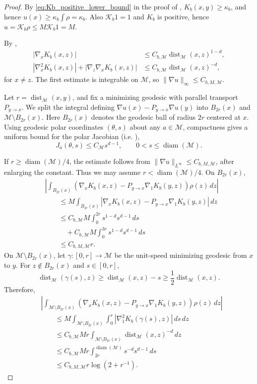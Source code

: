 \documentclass[11pt]{article}
\theoremstyle{definition}
\def\Kb{\mathcal K_b}
\def\M{\mathcal M}
\begin{document}
\begin{proof}
By \eqref{eq:Kb_positive_lower_bound} in the proof of
, \(K_b(x,y)\ge\kappa_b\), and hence
\(u(x)\ge\kappa_b\int\rho=\kappa_b\).
Also \(\Kb1=1\) and \(K_b\) is positive, hence \(u=\Kb\rho\le M\Kb1=M\).

By ,
\[
\begin{aligned}
|\nabla_xK_b(x,z)|
&\le C_{b,\M}\operatorname{dist}_{\M}(x,z)^{1-d},\\
|\nabla_x^2K_b(x,z)|+|\nabla_z\nabla_xK_b(x,z)|
&\le C_{b,\M}\operatorname{dist}_{\M}(x,z)^{-d},
\end{aligned}
\]
for \(x\neq z\). The first estimate is integrable on  \(\M\), so
\(\|\nabla u\|_\infty\le C_{b,M,\M}\).

Let \(r=\operatorname{dist}_{ \M}(x,y)\), and fix a minimizing geodesic with parallel
transport \(P_{y\to x}\). 
We split the integral defining \(\nabla u(x)-P_{y\to x}\nabla u(y)\) into
\(B_{2r}(x)\) and \( \M\setminus B_{2r}(x)\). 
Here $B_{2r}(x)$ denotes the geodesic ball of radius $2r$ centered at $x$. Using geodesic polar coordinates $(\theta,s)$ about any \(a\in\M\),
 compactness gives a uniform bound for the polar
Jacobian (i.e. \cite[Eq.~(9)]{girouard2021large}),
\[
J_a(\theta,s)\le C_{\M}s^{d-1},
\qquad
0<s\le\operatorname{diam}(\M).
\]

If \(r\ge\operatorname{diam}(\M)/4\), the estimate follows from
\(\|\nabla u\|_{L^\infty}\le C_{b,M,\M}\), after enlarging the constant. Thus we
may assume \(r<\operatorname{diam}(\M)/4\).
On $B_{2r}(x)$,
\[
\begin{aligned}
&\left|
\int_{B_{2r}(x)}
\left(\nabla_xK_b(x,z)-P_{y\to x}\nabla_1K_b(y,z)\right)
\rho(z)\,dz
\right|\\
&\qquad\leq M\int_{B_{2r}(x)}
\left|\nabla_xK_b(x,z)-P_{y\to x}\nabla_1K_b(y,z)\right|\,dz\\
&\qquad\le
C_{b,\M}M\int_0^{2r}s^{1-d}s^{d-1}\,ds\\
&\qquad\quad
+C_{b,\M}M\int_0^{3r}s^{1-d}s^{d-1}\,ds\\
&\qquad\le C_{b,M,\M}r.
\end{aligned}
\]
On \( \M\setminus B_{2r}(x)\), 
let \(\gamma:[0,r]\to\M\) be the unit-speed minimizing geodesic from \(x\)
to \(y\). For \(z\notin B_{2r}(x)\) and \(s\in[0,r]\),
\[
\operatorname{dist}_{\M}(\gamma(s),z)
\ge \operatorname{dist}_{\M}(x,z)-s
\ge \frac12\operatorname{dist}_{\M}(x,z).
\]
Therefore,
\[
\begin{aligned}
&\left|
\int_{\M\setminus B_{2r}(x)}
\left(\nabla_xK_b(x,z)-P_{y\to x}\nabla_1K_b(y,z)\right)
\rho(z)\,dz
\right|\\
&\qquad\le
M\int_{\M\setminus B_{2r}(x)}
\int_0^r
|\nabla_1^2K_b(\gamma(s),z)|\,ds\,dz\\
&\qquad\le
C_{b,\M}Mr
\int_{\M\setminus B_{2r}(x)}
\operatorname{dist}_{\M}(x,z)^{-d}\,dz\\
&\qquad\le
C_{b,\M}Mr
\int_{2r}^{\operatorname{diam}(\M)}s^{-d}s^{d-1}\,ds\\
&\qquad\le C_{b,M,\M}r\log(2+r^{-1}).
\end{aligned}
\]


\end{proof}
\end{document}
